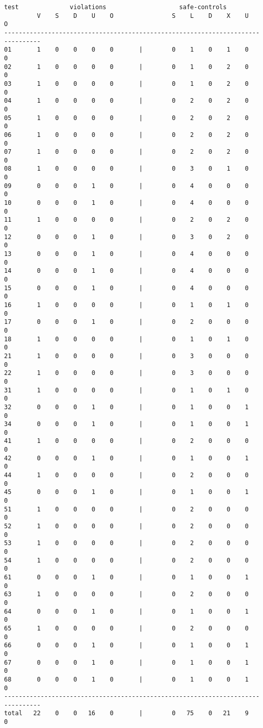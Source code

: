 \documentclass[11pt]{article}
\begin{document}
\begin{small}
\begin{verbatim}
test              violations                    safe-controls
         V    S    D    U    O                S    L    D    X    U    O
--------------------------------------------------------------------------------
01       1    0    0    0    0       |        0    1    0    1    0    0
02       1    0    0    0    0       |        0    1    0    2    0    0
03       1    0    0    0    0       |        0    1    0    2    0    0
04       1    0    0    0    0       |        0    2    0    2    0    0
05       1    0    0    0    0       |        0    2    0    2    0    0
06       1    0    0    0    0       |        0    2    0    2    0    0
07       1    0    0    0    0       |        0    2    0    2    0    0
08       1    0    0    0    0       |        0    3    0    1    0    0
09       0    0    0    1    0       |        0    4    0    0    0    0
10       0    0    0    1    0       |        0    4    0    0    0    0
11       1    0    0    0    0       |        0    2    0    2    0    0
12       0    0    0    1    0       |        0    3    0    2    0    0
13       0    0    0    1    0       |        0    4    0    0    0    0
14       0    0    0    1    0       |        0    4    0    0    0    0
15       0    0    0    1    0       |        0    4    0    0    0    0
16       1    0    0    0    0       |        0    1    0    1    0    0
17       0    0    0    1    0       |        0    2    0    0    0    0
18       1    0    0    0    0       |        0    1    0    1    0    0
21       1    0    0    0    0       |        0    3    0    0    0    0
22       1    0    0    0    0       |        0    3    0    0    0    0
31       1    0    0    0    0       |        0    1    0    1    0    0
32       0    0    0    1    0       |        0    1    0    0    1    0
34       0    0    0    1    0       |        0    1    0    0    1    0
41       1    0    0    0    0       |        0    2    0    0    0    0
42       0    0    0    1    0       |        0    1    0    0    1    0
44       1    0    0    0    0       |        0    2    0    0    0    0
45       0    0    0    1    0       |        0    1    0    0    1    0
51       1    0    0    0    0       |        0    2    0    0    0    0
52       1    0    0    0    0       |        0    2    0    0    0    0
53       1    0    0    0    0       |        0    2    0    0    0    0
54       1    0    0    0    0       |        0    2    0    0    0    0
61       0    0    0    1    0       |        0    1    0    0    1    0
63       1    0    0    0    0       |        0    2    0    0    0    0
64       0    0    0    1    0       |        0    1    0    0    1    0
65       1    0    0    0    0       |        0    2    0    0    0    0
66       0    0    0    1    0       |        0    1    0    0    1    0
67       0    0    0    1    0       |        0    1    0    0    1    0
68       0    0    0    1    0       |        0    1    0    0    1    0
--------------------------------------------------------------------------------
total   22    0    0   16    0       |        0   75    0   21    9    0
\end{verbatim}
\end{small}
\end{document}
